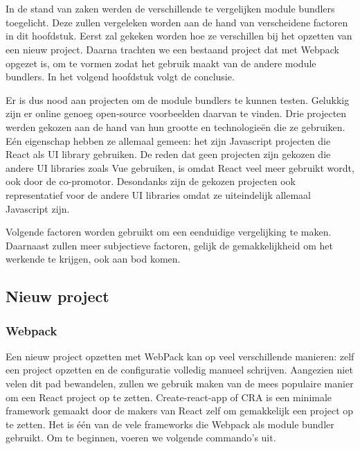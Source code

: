 
\chapter{}
\label{ch:methodologie}

In de stand van zaken werden de verschillende te vergelijken module bundlers toegelicht. Deze zullen vergeleken worden aan de hand van verscheidene factoren in dit hoofdstuk. 
Eerst zal gekeken worden hoe ze verschillen bij het opzetten van een nieuw project. Daarna trachten we een bestaand project dat met Webpack opgezet is, om te vormen zodat het gebruik maakt van de andere module bundlers. In het volgend hoofdstuk volgt de conclusie.

Er is dus nood aan projecten om de module bundlers te kunnen testen. Gelukkig zijn er online genoeg open-source voorbeelden daarvan te vinden. Drie projecten werden gekozen aan de hand van hun grootte en technologieën die ze gebruiken. Eén eigenschap hebben ze allemaal gemeen: het zijn Javascript projecten die React als UI library gebruiken. De reden dat geen projecten zijn gekozen die andere UI libraries zoals Vue gebruiken, is omdat React veel meer gebruikt wordt, ook door de co-promotor. Desondanks zijn de gekozen projecten ook representatief voor de andere UI libraries omdat ze uiteindelijk allemaal Javascript zijn. 

Volgende factoren worden gebruikt om een eenduidige vergelijking te maken. Daarnaast zullen meer subjectieve factoren, gelijk de gemakkelijkheid om het werkende te krijgen, ook aan bod komen.

\section{Nieuw project}
\subsection{Webpack}
Een nieuw project opzetten met WebPack kan op veel verschillende manieren: zelf een project opzetten en de configuratie volledig manueel schrijven. Aangezien niet velen dit pad bewandelen, zullen we gebruik maken van de mees populaire manier om een React project op te zetten. Create-react-app of CRA is een minimale framework gemaakt door de makers van React zelf om gemakkelijk een project op te zetten. Het is één van de vele frameworks die Webpack als module bundler gebruikt. Om te beginnen, voeren we volgende commando’s uit. 


